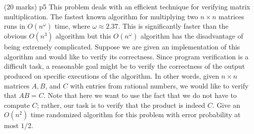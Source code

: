 \documentclass[a4paper, 11pt]{article}
\begin{document}
\begin{problem}{%
		\hfill  (20 marks)
}{p5%
}
This problem deals with an efficient technique for verifying matrix multiplication. The fastest known algorithm for multiplying two $n \times n$ matrices runs in $O\left(n^\omega\right)$ time, where $\omega \approx 2.37$. This is significantly faster than the obvious $O\left(n^3\right)$ algorithm but this $O\left(n^\omega\right)$ algorithm has the disadvantage of being extremely complicated. Suppose we are given an implementation of this algorithm and would like to verify its correctness. Since program verification is a difficult task, a reasonable goal might be to verify the correctness of the output produced on specific executions of the algorithm. In other words, given $n \times n$ matrices $A, B$, and $C$ with entries from rational numbers, we would like to verify that $A B=C$. Note that here we want to use the fact that we do not have to compute $C$; rather, our task is to verify that the product is indeed $C$. Give an $O\left(n^2\right)$ time randomized algorithm for this problem with error probability at most $1 / 2$.
\end{problem}
\end{document}
